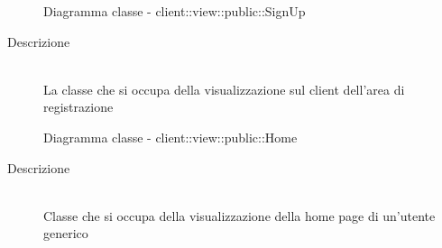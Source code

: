 \vspace{0.5cm}
\hypertarget{client::view::public::SignUp}{}
\begin{figure}[H]
	\centering
	\caption{Diagramma classe - client::view::public::SignUp}
\end{figure}\begin{description}
\item[Descrizione] \hfill \\
La classe che si occupa della visualizzazione sul client dell'area di registrazione
\end{description}

\vspace{0.5cm}
\hypertarget{client::view::public::Home}{}
\begin{figure}[H]
	\centering
	\caption{Diagramma classe - client::view::public::Home}
\end{figure}\begin{description}
\item[Descrizione] \hfill \\
Classe che si occupa della visualizzazione della home page di un'utente generico
\end{description}

\vspace{0.5cm}
